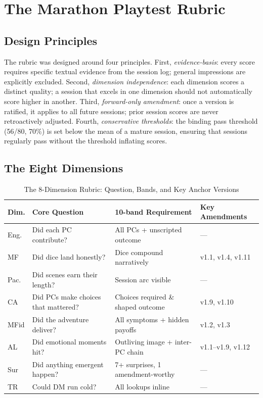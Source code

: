 
\section{The Marathon Playtest Rubric}
\label{sec:rubric}

\subsection{Design Principles}

The rubric was designed around four principles. First, \textit{evidence-basis}: every
score requires specific textual evidence from the session log; general impressions are
explicitly excluded. Second, \textit{dimension independence}: each dimension scores a
distinct quality; a session that excels in one dimension should not automatically score
higher in another. Third, \textit{forward-only amendment}: once a version is ratified,
it applies to all future sessions; prior session scores are never retroactively adjusted.
Fourth, \textit{conservative thresholds}: the binding pass threshold (56/80, 70\%)
is set below the mean of a mature session, ensuring that sessions regularly pass without
the threshold inflating scores.

\subsection{The Eight Dimensions}

\begin{table}[t]
\caption{The 8-Dimension Rubric: Question, Bands, and Key Anchor Versions}
\label{tab:dimensions}
\begin{tabular}{@{}llll@{}}
\toprule
Dim. & Core Question & 10-band Requirement & Key Amendments \\
\midrule
Eng. & Did each PC contribute? & All PCs + unscripted outcome & --- \\
MF & Did dice land honestly? & Dice compound narratively & v1.1, v1.4, v1.11 \\
Pac. & Did scenes earn their length? & Session arc visible & --- \\
CA  & Did PCs make choices that mattered? & Choices required \& shaped outcome & v1.9, v1.10 \\
MFid & Did the adventure deliver? & All symptoms + hidden payoffs & v1.2, v1.3 \\
AL  & Did emotional moments hit? & Outliving image + inter-PC chain & v1.1–v1.9, v1.12 \\
Sur & Did anything emergent happen? & 7+ surprises, 1 amendment-worthy & --- \\
TR  & Could DM run cold? & All lookups inline & --- \\
\bottomrule
\end{tabular}
\end{table}

